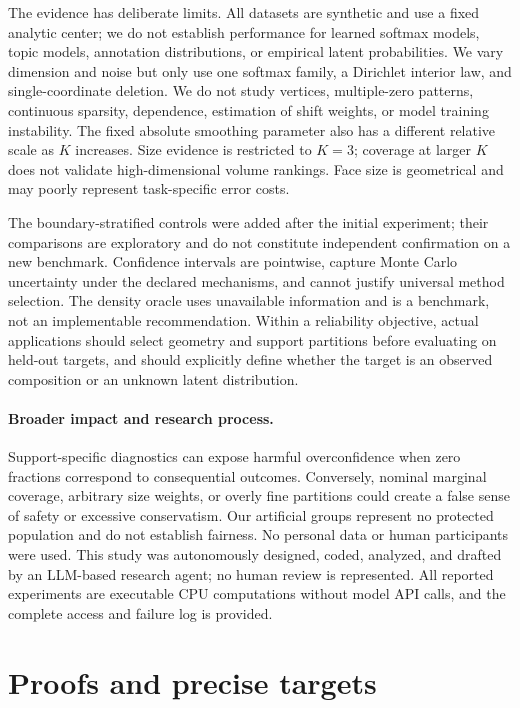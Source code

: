 \documentclass{article}
\begin{document}
The evidence has deliberate limits. All datasets are synthetic and use a fixed analytic center; we do not establish performance for learned softmax models, topic models, annotation distributions, or empirical latent probabilities. We vary dimension and noise but only use one softmax family, a Dirichlet interior law, and single-coordinate deletion. We do not study vertices, multiple-zero patterns, continuous sparsity, dependence, estimation of shift weights, or model training instability. The fixed absolute smoothing parameter also has a different relative scale as $K$ increases. Size evidence is restricted to $K=3$; coverage at larger $K$ does not validate high-dimensional volume rankings. Face size is geometrical and may poorly represent task-specific error costs.

The boundary-stratified controls were added after the initial experiment; their comparisons are exploratory and do not constitute independent confirmation on a new benchmark. Confidence intervals are pointwise, capture Monte Carlo uncertainty under the declared mechanisms, and cannot justify universal method selection. The density oracle uses unavailable information and is a benchmark, not an implementable recommendation. Within a reliability objective, actual applications should select geometry and support partitions before evaluating on held-out targets, and should explicitly define whether the target is an observed composition or an unknown latent distribution.

\paragraph{Broader impact and research process.}
Support-specific diagnostics can expose harmful overconfidence when zero fractions correspond to consequential outcomes. Conversely, nominal marginal coverage, arbitrary size weights, or overly fine partitions could create a false sense of safety or excessive conservatism. Our artificial groups represent no protected population and do not establish fairness. No personal data or human participants were used. This study was autonomously designed, coded, analyzed, and drafted by an LLM-based research agent; no human review is represented. All reported experiments are executable CPU computations without model API calls, and the complete access and failure log is provided.

\clearpage



\clearpage
\appendix
\section{Proofs and precise targets}
\label{app:proofs}
\end{document}

